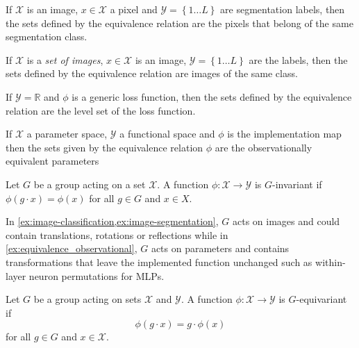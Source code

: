 \documentclass[mathematics,review,submit,moreauthors]{Definitions/mdpi}
\begin{document}
\begin{Example}\label{ex:image-segmentation}
    If $\mathcal{X}$ is an image, $x\in \mathcal{X}$ a pixel and $\mathcal Y = \left \{ 1\dots L\right \}$ are segmentation labels, then the sets defined by the equivalence relation are the pixels that belong of the same segmentation class.
\end{Example}

\begin{Example}\label{ex:image-classification}
    If $\mathcal{X}$ is a \emph{set of images}, $x\in \mathcal{X}$ is an image, $\mathcal Y = \left \{ 1\dots L\right \}$ are the labels, then the sets defined by the equivalence relation are images of the same class.
\end{Example}

\begin{Example}
    If $\mathcal Y = \mathbb R$ and $\phi$ is a generic loss function, then the sets defined by the equivalence relation are the level set of the loss function.
\end{Example}

\begin{Example}\label{ex:equivalence_observational}
    If $\mathcal X$ a parameter space, $\mathcal{Y}$ a functional space and $\phi$ is the implementation map then the sets given by the equivalence relation $\phi$ are the observationally equivalent parameters
\end{Example}

\begin{Definition}[Invariance]\label{def:invariance}
    Let $G$ be a group acting on a set $\mathcal{X}$.
    A function $\phi : \mathcal{X} \to \mathcal{Y}$ is $G$-invariant if $\phi(g\cdot x)=\phi(x)$ for all $g\in G$ and $x\in X$.
\end{Definition}

In \cref{ex:image-classification,ex:image-segmentation}, $G$ acts on images and could contain translations, rotations or reflections while in \cref{ex:equivalence_observational}, $G$ acts on parameters and contains transformations that leave the implemented function unchanged such as within-layer neuron permutations for MLPs.

\begin{Definition}[Equivariance]\label{def:equivariance}
    Let $G$ be a group acting on sets $\mathcal{X}$ and $\mathcal{Y}$. 
    A function $\phi : \mathcal{X} \to \mathcal{Y}$ is $G$-equivariant if
    \[
        \phi(g \cdot x) = g \cdot \phi(x)
    \]
    for all $g \in G$ and $x \in \mathcal{X}$.
\end{Definition}
\end{document}
